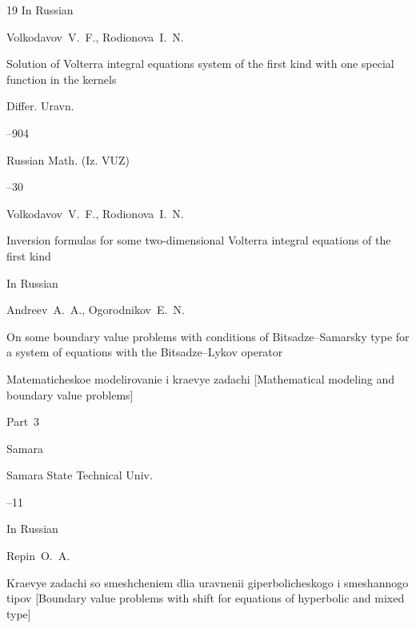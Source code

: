 \begin{thebibliography}{19}
\lang In Russian

\by Volkodavov~V.~F., Rodionova~I.~N.

\paper Solution of Volterra integral equations system of the first kind with one special function in the kernels

\jour Differ. Uravn.




–904








\jour Russian Math. (Iz. VUZ)




--30

\by Volkodavov~V.~F., Rodionova~I.~N.

\paper Inversion formulas for some two-dimensional Volterra integral equations of the first kind






\lang In Russian

\by Andreev~A.~A., Ogorodnikov~E.~N.

\paper On some boundary value problems with conditions of Bitsadze--Samarsky type for a system of equations with the  Bitsadze--Lykov operator

\inbook Matematicheskoe modelirovanie i kraevye zadachi \rm [Mathematical modeling and boundary value problems]

\issueinfo Part~3

\publaddr Samara

\publ Samara State Technical Univ.


--11




\lang In Russian

\by Repin~O.~A.

\book Kraevye zadachi so smeshcheniem dlia uravnenii giperbolicheskogo i smeshannogo tipov \rm [Boundary value problems with shift for equations of hyperbolic and mixed type]


\end{thebibliography}
